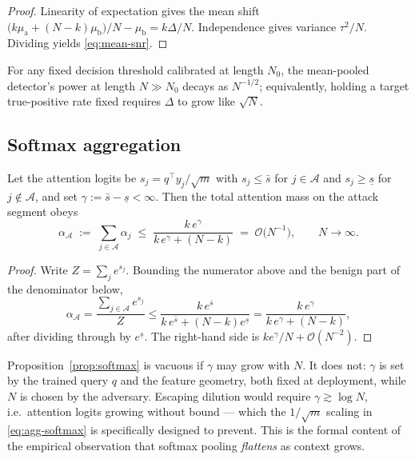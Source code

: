 \begin{proof}
Linearity of expectation gives the mean shift $\big(k\mu_{\mathrm{a}}+(N-k)\mu_{\mathrm{b}}\big)/N-\mu_{\mathrm{b}}=k\Delta/N$. Independence gives variance $\tau^2/N$. Dividing yields \eqref{eq:mean-snr}.
\end{proof}

\begin{corollary}
\label{cor:mean-collapse}
For any fixed decision threshold calibrated at length $N_0$, the mean-pooled detector's
power at length $N\gg N_0$ decays as $N^{-1/2}$; equivalently, holding a target
true-positive rate fixed requires $\Delta$ to grow like $\sqrt{N}$.
\end{corollary}

\subsection{Softmax aggregation}

\begin{proposition}
\label{prop:softmax}
Let the attention logits be $s_j=q^\top y_j/\sqrt{m}$ with
$s_j\le \bar{s}$ for $j\in\mathcal{A}$ and $s_j\ge \underline{s}$ for
$j\notin\mathcal{A}$, and set $\gamma:=\bar{s}-\underline{s}<\infty$. Then the total
attention mass on the attack segment obeys
\begin{equation}
  \alpha_{\mathcal{A}}
  \;:=\;\sum_{j\in\mathcal{A}}\alpha_j
  \;\le\; \frac{k\,e^{\gamma}}{k\,e^{\gamma}+(N-k)}
  \;=\;\mathcal{O}\!\big(N^{-1}\big),
  \qquad N\to\infty .
  \label{eq:softmax-mass}
\end{equation}
\end{proposition}

\begin{proof}
Write $Z=\sum_{j}e^{s_j}$. Bounding the numerator above and the benign part of the
denominator below,
\[
  \alpha_{\mathcal{A}}
  =\frac{\sum_{j\in\mathcal{A}}e^{s_j}}{Z}
  \le\frac{k\,e^{\bar{s}}}{k\,e^{\bar{s}}+(N-k)e^{\underline{s}}}
  =\frac{k\,e^{\gamma}}{k\,e^{\gamma}+(N-k)} ,
\]
after dividing through by $e^{\underline{s}}$. The right-hand side is
$k e^{\gamma}/N+\mathcal{O}(N^{-2})$.
\end{proof}

\begin{remark}
\label{rem:gamma}
Proposition~\ref{prop:softmax} is vacuous if $\gamma$ may grow with $N$. It does not:
$\gamma$ is set by the trained query $q$ and the feature geometry, both fixed at
deployment, while $N$ is chosen by the adversary. Escaping dilution would require
$\gamma\gtrsim\log N$, i.e.\ attention logits growing without bound --- which the
$1/\sqrt{m}$ scaling in \eqref{eq:agg-softmax} is specifically designed to prevent.
This is the formal content of the empirical observation that softmax pooling
\emph{flattens} as context grows.
\end{remark}

